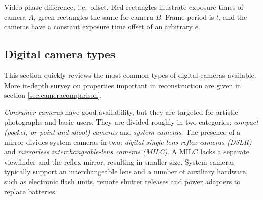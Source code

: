 
{Video phase difference, i.e.~offset.
Red rectangles illustrate exposure times of camera $A$, green rectangles the same for camera $B$.
Frame period is $t$, and the cameras have a constant exposure time offset of an arbitrary $e$.}


\subsection{Digital camera types} \label{sec:cameratypes} %


This section quickly reviews the most common types of digital cameras available.
More in-depth survey on properties important in reconstruction are given in section \ref{sec:cameracomparison}.
%
%

\emph{Consumer cameras} have good availability, but they are targeted for artistic photographs and basic users.
They are divided roughly in two categories: \emph{compact (pocket, or point-and-shoot) cameras} and \emph{system cameras}.
The presence of a mirror divides system cameras in two: \emph{digital single-lens reflex cameras (DSLR)} and \emph{mirrorless interchangeable-lens cameras (MILC)}.
A MILC lacks a separate viewfinder and the reflex mirror, resulting in smaller size.
System cameras typically support an interchangeable lens and a number of auxiliary hardware, such as electronic flash units, remote shutter releases and power adapters to replace batteries.

